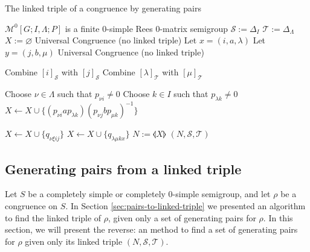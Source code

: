 \begin{algorithm}
\caption{The linked triple of a congruence by generating pairs}
\label{alg:pairs-to-linked-triple}
\begin{algorithmic}[1]
    \Require $\mathcal{M}^0[G;I,\Lambda;P]$ is a finite 0-simple Rees 0-matrix semigroup
      \State $\mathcal{S} := \Delta_I$
      \State $\mathcal{T} := \Delta_\Lambda$
      \State $X := \varnothing$
          \State \Continue
          \State \Return Universal Congruence (no linked triple)
        \EndIf
        \State Let $x=(i,a,\lambda)$
        \State Let $y=(j,b,\mu)$
          \State \Return Universal Congruence (no linked triple)
        \EndIf

        \State Combine $[i]_\mathcal{S}$ with $[j]_\mathcal{S}$
        \State Combine $[\lambda]_\mathcal{T}$ with $[\mu]_\mathcal{T}$

        \State Choose $\nu \in \Lambda$ such that $p_{\nu i} \neq 0$
        \State Choose $k \in I$ such that $p_{\lambda k} \neq 0$
        \State $X \gets X \cup \{(p_{\nu i}ap_{\lambda k})(p_{\nu j}bp_{\mu k})^{-1}\}$

          \State $X \gets X \cup \{q_{\nu \xi i j}\}$
        \EndFor
          \State $X \gets X \cup \{q_{\lambda \mu k x}\}$
        \EndFor
      \EndFor
      \State $N := \llangle X \rrangle$
      \State \Return $(N,\mathcal{S},\mathcal{T})$
    \EndProcedure
\end{algorithmic}
\end{algorithm}

\subsection{Generating pairs from a linked triple}
\label{sec:linked-triple-to-pairs}

Let $S$ be a completely simple or completely 0-simple semigroup, and let $\rho$
be a congruence on $S$.  In Section \ref{sec:pairs-to-linked-triple} we
presented an algorithm to find the linked triple of $\rho$, given only a set of
generating pairs for $\rho$.  In this section, we will present the reverse: an
method to find a set of generating pairs for $\rho$ given only its linked triple
$(N, \mathcal{S}, \mathcal{T})$.

